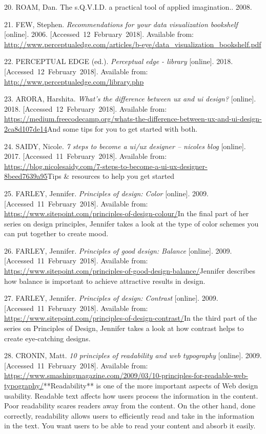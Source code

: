 \documentclass[american,a4paper,oneside,,tablecaptionabove]{scrbook}
\begin{document}
\hypertarget{ref-Roam.2008b}{}
20. ROAM, Dan. The s.Q.V.I.D. a practical tool of applied imagination..
2008.

\hypertarget{ref-Few.2006}{}
21. FEW, Stephen. \emph{Recommendations for your data visualization
bookshelf} {[}online{]}. 2006. {[}Accessed~12~February~2018{]}.
Available from:
\url{http://www.perceptualedge.com/articles/b-eye/data_visualization_bookshelf.pdf}

\hypertarget{ref-PerceptualEdge.2018}{}
22. PERCEPTUAL EDGE (ed.). \emph{Perceptual edge - library}
{[}online{]}. 2018. {[}Accessed~12~February~2018{]}. Available from:
\url{http://www.perceptualedge.com/library.php}

\hypertarget{ref-Arora.2018}{}
23. ARORA, Harshita. \emph{What's the difference between ux and ui
design?} {[}online{]}. 2018. {[}Accessed~12~February~2018{]}. Available
from:
\url{https://medium.freecodecamp.org/whats-the-difference-between-ux-and-ui-design-2ca8d107de14}And
some tips for you to get started with both.

\hypertarget{ref-Saidy.2017}{}
24. SAIDY, Nicole. \emph{7 steps to become a ui/ux designer -- nicoles
blog} {[}online{]}. 2017. {[}Accessed~11~February~2018{]}. Available
from:
\url{https://blog.nicolesaidy.com/7-steps-to-become-a-ui-ux-designer-8beed7639a95}Tips
\& resources to help you get started

\hypertarget{ref-Farley.2009}{}
25. FARLEY, Jennifer. \emph{Principles of design: Color} {[}online{]}.
2009. {[}Accessed~11~February~2018{]}. Available from:
\url{https://www.sitepoint.com/principles-of-design-colour/}In the final
part of her series on design principles, Jennifer takes a look at the
type of color schemes you can put together to create mood.

\hypertarget{ref-Farley.2009b}{}
26. FARLEY, Jennifer. \emph{Principles of good design: Balance}
{[}online{]}. 2009. {[}Accessed~11~February~2018{]}. Available from:
\url{https://www.sitepoint.com/principles-of-good-design-balance/}Jennifer
describes how balance is important to achieve attractive results in
design.

\hypertarget{ref-Farley.2009c}{}
27. FARLEY, Jennifer. \emph{Principles of design: Contrast}
{[}online{]}. 2009. {[}Accessed~11~February~2018{]}. Available from:
\url{https://www.sitepoint.com/principles-of-design-contrast/}In the
third part of the series on Principles of Design, Jennifer takes a look
at how contrast helps to create eye-catching designs.

\hypertarget{ref-Cronin.2009}{}
28. CRONIN, Matt. \emph{10 principles of readability and web typography}
{[}online{]}. 2009. {[}Accessed~11~February~2018{]}. Available from:
\url{https://www.smashingmagazine.com/2009/03/10-principles-for-readable-web-typography/}**Readability**
is one of the more important aspects of Web design usability. Readable
text affects how users process the information in the content. Poor
readability scares readers away from the content. On the other hand,
done correctly, readability allows users to efficiently read and take in
the information in the text. You want users to be able to read your
content and absorb it easily.
\end{document}
